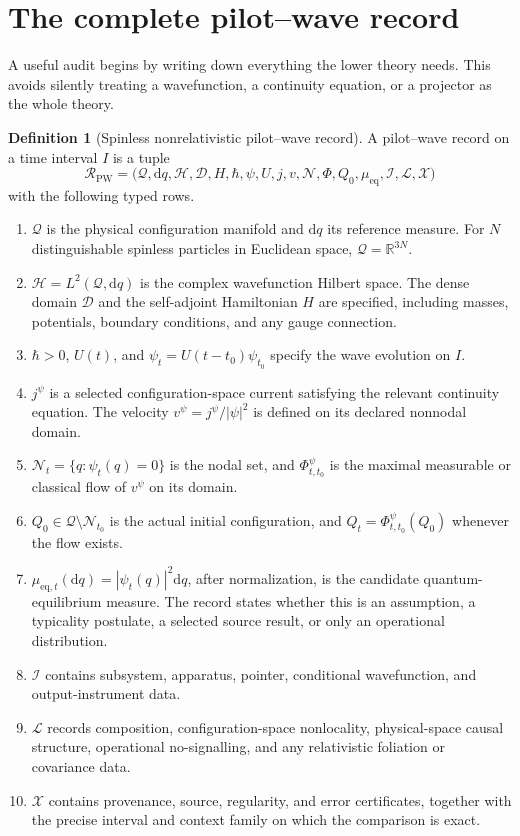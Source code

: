 \documentclass[11pt]{article}
\theoremstyle{definition}
\newtheorem{definition}[theorem]{Definition}
\theoremstyle{remark}
\newcommand{\cD}{\mathcal D}
\newcommand{\cH}{\mathcal H}
\newcommand{\cI}{\mathcal I}
\newcommand{\cL}{\mathcal L}
\newcommand{\cN}{\mathcal N}
\newcommand{\cQ}{\mathcal Q}
\newcommand{\cR}{\mathcal R}
\newcommand{\cX}{\mathcal X}
\newcommand{\dd}{\mathrm d}
\let\MTToriginalitem\item
\renewcommand{\item}{\par\MTToriginalitem}
\begin{document}
\section{The complete pilot--wave record}
\label{sec:record}

A useful audit begins by writing down everything the lower theory needs.
This avoids silently treating a wavefunction, a continuity equation, or a
projector as the whole theory.

\begin{definition}[Spinless nonrelativistic pilot--wave record]
\label{def:record}
A pilot--wave record on a time interval \(I\) is a tuple
\[
\cR_{\mathrm{PW}}
=
\bigl(
\cQ,\dd q,\cH,\cD,H,\hbar,\psi,U,
j,v,\cN,\Phi,Q_0,\mu_{\mathrm{eq}},
\cI,\cL,\cX
\bigr)
\]
with the following typed rows.
\begin{enumerate}[leftmargin=2.2em]
\item \(\cQ\) is the physical configuration manifold and \(\dd q\) its
      reference measure.  For \(N\) distinguishable spinless particles in
      Euclidean space, \(\cQ=\mathbb R^{3N}\).
\item \(\cH=L^2(\cQ,\dd q)\) is the complex wavefunction Hilbert space.
      The dense domain \(\cD\) and the self-adjoint Hamiltonian \(H\) are
      specified, including masses, potentials, boundary conditions, and any
      gauge connection.
\item \(\hbar>0\), \(U(t)\), and
      \(\psi_t=U(t-t_0)\psi_{t_0}\) specify the wave evolution on \(I\).
\item \(j^{\psi}\) is a selected configuration-space current satisfying
      the relevant continuity equation.  The velocity
      \(v^\psi=j^\psi/|\psi|^2\) is defined on its declared nonnodal domain.
\item \(\cN_t=\{q:\psi_t(q)=0\}\) is the nodal set, and
      \(\Phi^\psi_{t,t_0}\) is the maximal measurable or classical flow of
      \(v^{\psi}\) on its domain.
\item \(Q_0\in\cQ\setminus\cN_{t_0}\) is the actual initial configuration,
      and \(Q_t=\Phi^\psi_{t,t_0}(Q_0)\) whenever the flow exists.
\item \(\mu_{\mathrm{eq},t}(\dd q)=|\psi_t(q)|^2\dd q\), after
      normalization, is the candidate quantum-equilibrium measure.
      The record states whether this is an assumption, a typicality
      postulate, a selected source result, or only an operational
      distribution.
\item \(\cI\) contains subsystem, apparatus, pointer, conditional
      wavefunction, and output-instrument data.
\item \(\cL\) records composition, configuration-space nonlocality,
      physical-space causal structure, operational no-signalling, and any
      relativistic foliation or covariance data.
\item \(\cX\) contains provenance, source, regularity, and error
      certificates, together with the precise interval and context family
      on which the comparison is exact.
\end{enumerate}
\end{definition}
\end{document}
